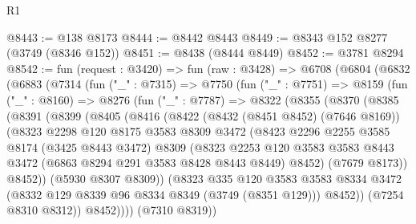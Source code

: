 \begin{lexlean}{R1}
\begin{coremodule}
@8443 := @138 @8173
@8444 := @8442 @8443
@8449 := @8343 @152 @8277 (@3749 (@8346 @152))
@8451 := @8438 (@8444 @8449)
@8452 := @3781 @8294
@8542 := fun (request : @3420) =>
  fun (raw : @3428) =>
  @6708
    (@6804
      (@6832
        (@6883
          (@7314
            (fun ("_" : @7315) =>
            @7750
              (fun ("_" : @7751) =>
              @8159
                (fun ("_" : @8160) =>
                @8276
                  (fun ("_" : @7787) =>
                  @8322
                    (@8355
                      (@8370
                        (@8385
                          (@8391
                            (@8399
                              (@8405
                                (@8416
                                  (@8422
                                    (@8432 (@8451 @8452) (@7646 @8169))
                                    (@8323
                                      @2298
                                      @120
                                      @8175
                                      @3583
                                      @8309
                                      @3472
                                      (@8423
                                        @2296
                                        @2255
                                        @3585
                                        @8174
                                        (@3425 @8443 @3472)
                                        @8309
                                        (@8323
                                          @2253
                                          @120
                                          @3583
                                          @3583
                                          @8443
                                          @3472
                                          (@6863 @8294 @291 @3583 @8428 @8443 @8449)
                                          @8452)
                                        (@7679 @8173))
                                      @8452))
                                  (@5930 @8307 @8309))
                                (@8323
                                  @335
                                  @120
                                  @3583
                                  @3583
                                  @8334
                                  @3472
                                  (@8332 @129 @8339 @96 @8334 @8349 (@3749 (@8351 @129)))
                                  @8452))
                              (@7254 @8310 @8312))
                            @8452))))
                    (@7310 @8319))

\end{coremodule}
\end{lexlean}
